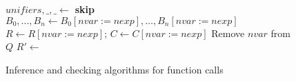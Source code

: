 \begin{figure}[p]
\begin{algorithmic}[1]
    \State $\mathit{unifiers}, \_, \_ \gets$ 
      \textbf{skip}
    \Else
        \State $B_0,...,B_n\gets B_0[\mathit{nvar} := \mathit{nexp}],\ldots,B_n[\mathit{nvar} := \mathit{nexp}]$
        \State $R\gets R[\mathit{nvar} := \mathit{nexp}]$;
        $C\gets C[\mathit{nvar} := \mathit{nexp}]$
        \State Remove $\mathit{nvar}$ from $Q$
      \EndFor
    \EndIf
  \EndIf
  \State $R'\gets$ 
  \State \Return {}
  \EndFunction
\end{algorithmic}
\label{fig:funapp}
\caption{Inference and checking algorithms for function calls}
\end{figure}
